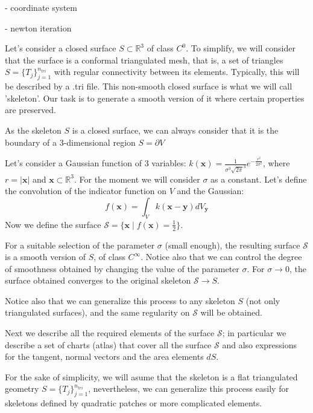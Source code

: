 \documentclass[11pt]{article}
\newcommand\bx{\boldsymbol x}
\newcommand\by{\boldsymbol y}
\begin{document}
- coordinate system

- newton iteration




Let's consider a closed surface $\mathit{S}\subset \mathbb{R}^3$ of
class $C^0$. To simplify, we will consider that the surface is a
conformal triangulated mesh, that is, a set of triangles
$\mathit{S}=\{\mathit{T}_j\}_{j=1}^{n_{tri}}$ with regular
connectivity between its elements. Typically, this will be described
by a .tri file. This non-smooth closed surface is what we will call
'skeleton'. Our task is to generate a smooth version of it where
certain properties are preserved.

As the skeleton $\mathit{S}$ is a closed surface, we can always consider that it is the boundary of a 3-dimensional region $\mathit{S}=\partial \mathit{V}$ 

Let's consider a Gaussian function of 3 variables: $k(\bx)=\frac{1}{\sigma^3\sqrt{2\pi}^3}e^{-\frac{r^2}{2\sigma^2}}$, where $r=|\bx|$ and $\bx\subset \mathbb{R}^3$. For the moment we will consider $\sigma$ as a constant.
Let's define the convolution of the indicator function on $\mathit{V}$ and the Gaussian:
$$f(\bx)=\int_{V}k(\bx-\by)dV_{\by}$$
Now we define the surface $\mathcal{S}=\{\bx \mid f(\bx)=\frac{1}{2}\}$.

For a suitable selection of the parameter $\sigma$ (small enough), the resulting surface $\mathcal{S}$ is a smooth version of $\mathit{S}$, of class $C^{\infty}$. Notice also that we can control the degree of smoothness obtained by changing the value of the parameter $\sigma$. For $\sigma \rightarrow 0$, the surface obtained converges to the original skeleton $\mathcal{S}\rightarrow \mathit{S}$.

Notice also that we can generalize this process to any skeleton $\mathit{S}$ (not only triangulated surfaces), and the same regularity on $\mathcal{S}$ will be obtained.

Next we describe all the required elements of the surface $\mathcal{S}$; in particular we describe a set of charts (atlas) that cover all the surface $\mathcal{S}$ and also expressions for the tangent, normal vectors and the area elements $dS$.







For the sake of simplicity, we will asume that the skeleton is a flat triangulated geometry $\mathit{S}=\{\mathit{T}_j\}_{j=1}^{n_{tri}}$, nevertheless, we can generalize this process easily for skeletons defined by quadratic patches or more complicated elements.
\end{document}
